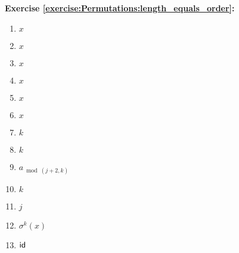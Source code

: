 \noindent\textbf{Exercise \ref{exercise:Permutations:length_equals_order}:}
%
\begin{multicols}{3}
\begin{enumerate}
\item
$x$

%
\item
$x$

\item
$x$

\item
$x$

\item
$x$

\item
$x$

\item
$k$

\item
$k$

\item
$a_{\bmod{(j+2,k)}}$

\item
$k$

\item
$j$

\item
%
$\sigma^k(x)$

\item
$\sf{id}$
\end{enumerate}
\end{multicols}

